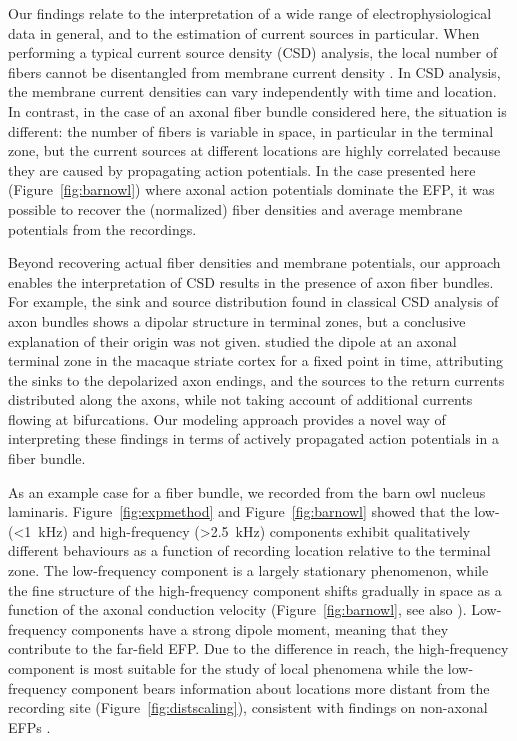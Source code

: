 \documentclass[]{elife}
\begin{document}
Our findings relate to the interpretation of a wide range of
electrophysiological data in general, and to the estimation of current
sources in particular. When performing a typical current source density
(CSD) analysis, the local number of fibers cannot be disentangled from
membrane current density
\citep{Nicholson1973Theoretical, Potworowski2011Kernel}. In CSD
analysis, the membrane current densities can vary independently with
time and location. In contrast, in the case of an axonal fiber bundle
considered here, the situation is different: the number of fibers is
variable in space, in particular in the terminal zone, but the current
sources at different locations are highly correlated because they are
caused by propagating action potentials. In the case presented here
(Figure~\ref{fig:barnowl}) where axonal action potentials dominate the
EFP, it was possible to recover the (normalized) fiber densities and
average membrane potentials from the recordings.

Beyond recovering actual fiber densities and membrane potentials, our
approach enables the interpretation of CSD results in the presence of
axon fiber bundles. For example, the sink and source distribution found
in classical CSD analysis of axon bundles
\citep{Mitzdorf1978Prominent, Mitzdorf1985Current, Mitzdorf1977Laminar}
shows a dipolar structure in terminal zones, but a conclusive
explanation of their origin was not given.
\citet{Tenke1993Interpretation} studied the dipole at an axonal terminal
zone in the macaque striate cortex for a fixed point in time,
attributing the sinks to the depolarized axon endings, and the sources
to the return currents distributed along the axons, while not taking
account of additional currents flowing at bifurcations. Our modeling
approach provides a novel way of interpreting these findings in terms of
actively propagated action potentials in a fiber bundle.

As an example case for a fiber bundle, we recorded from the barn owl
nucleus laminaris. Figure~\ref{fig:expmethod} and
Figure~\ref{fig:barnowl} showed that the low- (\textless{}1~kHz) and
high-frequency (\textgreater{}2.5~kHz) components exhibit qualitatively
different behaviours as a function of recording location relative to the
terminal zone. The low-frequency component is a largely stationary
phenomenon, while the fine structure of the high-frequency component
shifts gradually in space as a function of the axonal conduction
velocity (Figure~\ref{fig:barnowl}, see also \citet{Carr2015Maps}).
Low-frequency components have a strong dipole moment, meaning that they
contribute to the far-field EFP. Due to the difference in reach, the
high-frequency component is most suitable for the study of local
phenomena while the low-frequency component bears information about
locations more distant from the recording site
(Figure~\ref{fig:distscaling}), consistent with findings on non-axonal
EFPs \citep{Pettersen2008Amplitude, Leski2013Frequency}.
\end{document}
